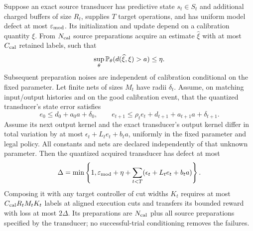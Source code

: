 \begin{theorem}
\label{thm:joint-transport}
Suppose an exact source transducer has predictive state $s_t\in S_t$
and additional charged buffers of size $R_t$, supplies $T$ target
operations, and has uniform model defect at most $\varepsilon_{\rm mod}$.
Its initialization and update depend on a calibration quantity $\xi$.
From $N_{\rm cal}$ source preparations acquire an estimate $\widehat\xi$
with at most $C_{\rm cal}$ retained labels, such that
\[
 \sup_\theta\mathbb P_\theta(d(\widehat\xi,\xi)>a)\le\eta.
\]
Subsequent preparation noises are independent of calibration conditional
on the fixed parameter. Let finite nets of sizes $M_t$ have radii
$\delta_t$. Assume, on matching input/output histories and on the good
calibration event, that the quantized transducer's state error satisfies
\begin{equation}\label{eq:joint-error-recursion}
 e_0\le d_0+a_0a+\delta_0,\qquad
 e_{t+1}\le\rho_t e_t+d_{t+1}+a_{t+1}a+\delta_{t+1}.
\end{equation}
Assume its next output kernel and the exact transducer's output kernel
differ in total variation by at most
$\epsilon_t+L_t e_t+b_ta$, uniformly in the fixed parameter and legal
policy. All constants and nets are declared independently of that
unknown parameter. Then the quantized acquired transducer has defect
at most
\begin{equation}\label{eq:joint-defect}
 \Delta=\min\left\{1,\varepsilon_{\rm mod}+\eta+
                 \sum_{t<T}(\epsilon_t+L_te_t+b_ta)\right\}.
\end{equation}
Composing it with any target controller of cut widths $K_t$ requires at
most $C_{\rm cal}R_tM_tK_t$ labels at aligned execution cuts and transfers
its bounded reward with loss at most $2\Delta$. Its preparations are
$N_{\rm cal}$ plus all source preparations specified by the transducer;
no successful-trial conditioning removes the failures.
\end{theorem}
